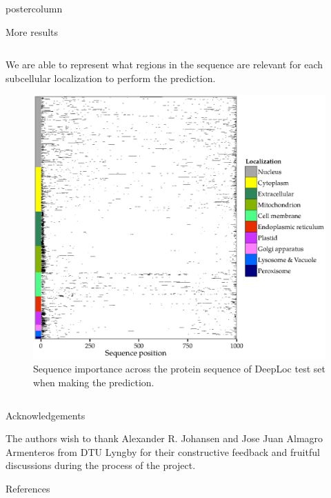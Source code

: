 \documentclass[final,hyperref={pdfpagelabels=false}]{beamer}
\begin{document}
\begin{frame}
\begin{columns}
\begin{column}{.49\paperwidth}
\begin{beamercolorbox}[center,wd=\textwidth]{postercolumn}
\begin{minipage}[T]{.99\textwidth}
{\begin{block}{More results}
\begin{columns}
\begin{column}{1\textwidth}
\centering

\centering
\begin{minipage}[t]{.95\textwidth}


\vspace{-0.5cm}

\small{We are able to represent what regions in the sequence are relevant for each subcellular localization to perform the prediction.}

\vspace{0.4cm}
\begin{figure}
\centering
\includegraphics[width=0.9\linewidth]{Sequence_importance.eps}
 \caption{Sequence importance across the protein sequence of DeepLoc test set when making the prediction.}
\end{figure}  


\end{minipage}

\end{column}
\end{columns}
\end{block}	

\vfill

\begin{block}{Acknowledgements}
\centering
\begin{minipage}[t]{0.98\textwidth}

\small{The authors wish to thank Alexander R. Johansen and Jose Juan Almagro Armenteros from DTU Lyngby for their constructive feedback and fruitful discussions during the process of the project.}
\end{minipage}
\end{block}
\vfill
\begin{block}{References}


\end{block}}
\end{minipage}
\end{beamercolorbox}
\end{column}
\end{columns}
\end{frame}
\end{document}
